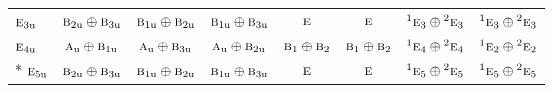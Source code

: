 \documentclass[10pt,a4paper]{article}
\numberwithin{equation}{section}
\newcommand{\irr}[1]{\text{\normalfont\scshape #1}}
\newcommand{\conjpair}[1]{{}^{#1}}
\newcommand{\ptag}[1]{\mathrm{#1}}
\begin{document}
{\begin{longtable}{@{}lccccccc@{}}
$\irr{e}_{3\ptag{u}}$ & $\irr{b}_{2\ptag{u}}\oplus \irr{b}_{3\ptag{u}}$ & $\irr{b}_{1\ptag{u}}\oplus \irr{b}_{2\ptag{u}}$ & $\irr{b}_{1\ptag{u}}\oplus \irr{b}_{3\ptag{u}}$ & $\irr{e}$ & $\irr{e}$ & $\conjpair{1}\irr{e}_{3}\oplus \conjpair{2}\irr{e}_{3}$ & $\conjpair{1}\irr{e}_{3}\oplus \conjpair{2}\irr{e}_{3}$\\
$\irr{e}_{4\ptag{u}}$ & $\irr{a}_{\ptag{u}}\oplus \irr{b}_{1\ptag{u}}$ & $\irr{a}_{\ptag{u}}\oplus \irr{b}_{3\ptag{u}}$ & $\irr{a}_{\ptag{u}}\oplus \irr{b}_{2\ptag{u}}$ & $\irr{b}_{1}\oplus \irr{b}_{2}$ & $\irr{b}_{1}\oplus \irr{b}_{2}$ & $\conjpair{1}\irr{e}_{4}\oplus \conjpair{2}\irr{e}_{4}$ & $\conjpair{1}\irr{e}_{2}\oplus \conjpair{2}\irr{e}_{2}$\\*
$\irr{e}_{5\ptag{u}}$ & $\irr{b}_{2\ptag{u}}\oplus \irr{b}_{3\ptag{u}}$ & $\irr{b}_{1\ptag{u}}\oplus \irr{b}_{2\ptag{u}}$ & $\irr{b}_{1\ptag{u}}\oplus \irr{b}_{3\ptag{u}}$ & $\irr{e}$ & $\irr{e}$ & $\conjpair{1}\irr{e}_{5}\oplus \conjpair{2}\irr{e}_{5}$ & $\conjpair{1}\irr{e}_{5}\oplus \conjpair{2}\irr{e}_{5}$\\
\bottomrule\end{longtable}}
\end{document}
